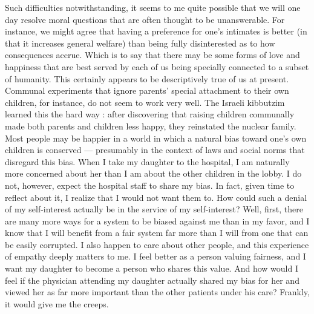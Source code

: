 \documentclass[a4paper,14pt]{extarticle}
\begin{document}
Such difficulties notwithstanding, it seems to me quite possible that we will one day resolve moral questions that are often thought to be unanswerable.
For instance, we might agree that having a preference for one's intimates is better (in that it increases general welfare) than being fully disinterested as to how consequences accrue.
Which is to say that there may be some forms of love and happiness that are best served by each of us being specially connected to a subset of humanity.
This certainly appears to be descriptively true of us at present.
Communal experiments that ignore parents' special attachment to their own children, for instance, do not seem to work very well.
The Israeli kibbutzim learned this the hard way :
after discovering that raising children communally made both parents and children less happy, they reinstated the nuclear family.
Most people may be happier in a world in which a natural bias toward one's own children is conserved --- presumably in the context of laws and social norms that disregard this bias.
When I take my daughter to the hospital, I am naturally more concerned about her than I am about the other children in the lobby.
I do not, however, expect the hospital staff to share my bias.
In fact, given time to reflect about it, I realize that I would not want them to.
How could such a denial of my self-interest actually be in the service of my self-interest?
Well, first, there are many more ways for a system to be biased against me than in my favor, and I know that I will benefit from a fair system far more than I will from one that can be easily corrupted.
I also happen to care about other people, and this experience of empathy deeply matters to me.
I feel better as a person valuing fairness, and I want my daughter to become a person who shares this value.
And how would I feel if the physician attending my daughter actually shared my bias for her and viewed her as far more important than the other patients under his care?
Frankly, it would give me the creeps.
\end{document}
